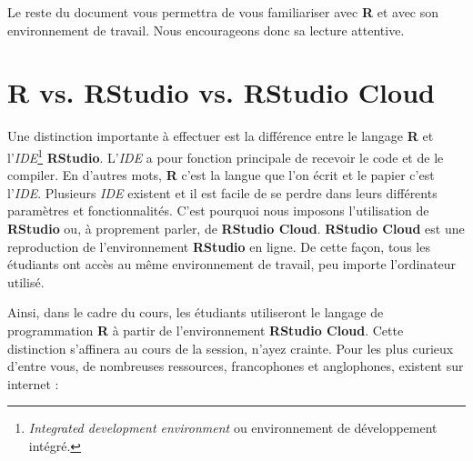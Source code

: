 \documentclass[10.5pt,a4paper]{article}
\begin{document}
Le reste du document vous permettra de vous familiariser avec \textbf{R} et avec son environnement de travail. Nous encourageons donc sa lecture attentive.

\section{R vs. RStudio vs. RStudio Cloud}\label{R vs RStudio vs RStudio Cloud}

Une distinction importante à effectuer est la différence entre le langage \textbf{R} et l'\textit{IDE}\footnote{\emph{Integrated development environment} ou environnement de développement intégré.} \textbf{RStudio}. L'\textit{IDE} a pour fonction principale de recevoir le code et de le compiler. En d'autres mots, \textbf{R} c'est la langue que l'on écrit et le papier c'est l'\textit{IDE}. Plusieurs \textit{IDE} existent et il est facile de se perdre dans leurs différents paramètres et fonctionnalités. C'est pourquoi nous imposons l'utilisation de \textbf{RStudio} ou, à proprement parler, de \textbf{RStudio Cloud}. \textbf{RStudio Cloud} est une reproduction de l'environnement \textbf{RStudio} en ligne. De cette façon, tous les étudiants ont accès au même environnement de travail, peu importe l'ordinateur utilisé.  

Ainsi, dans le cadre du cours, les étudiants utiliseront le langage de programmation \textbf{R} à partir de l'environnement \textbf{RStudio Cloud}. Cette distinction s'affinera au cours de la session, n'ayez crainte. Pour les plus curieux d'entre vous, de nombreuses ressources, francophones et anglophones, existent sur internet :
\end{document}
